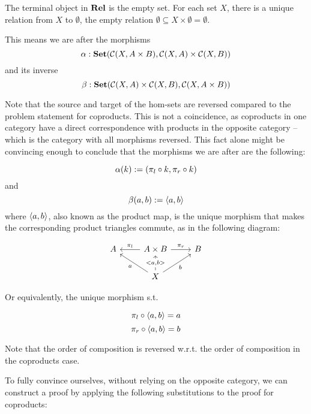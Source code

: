 \begin{solution}\label{sol:terminal_rel}
	The terminal object in $\mathbf{Rel}$ is the empty set. For each set $X$, there is a unique relation from $X$ to $\emptyset$, the empty relation $\emptyset \subseteq X \times \emptyset = \emptyset$.
\end{solution}

\begin{solution}\label{sol:product-represent}
\newcommand{\CP}{\CC(A+B,X)}
\newcommand{\CQ}{\CC(A,X)\times\CC(B,X)}
\newcommand{\PP}{\CC(X,A\times B)}
\newcommand{\PQ}{\CC(X,A)\times\CC(X,B)}
	
This means we are after the morphisms \[\alpha:\SET(\PP, \PQ)\] and its inverse \[\beta:\SET(\PQ, \PP)\]

Note that the source and target of the hom-sets are reversed compared to the problem statement for coproducts. This is not a coincidence, as coproducts in one category have a direct correspondence with products in the opposite category -- which is the category with all morphisms reversed. This fact alone might be convincing enough to conclude that the morphisms we are after are the following:

\[\alpha(k):=(\pi_l \circ k, \pi_r \circ k)\] and \[\beta(a,b) := \langle a, b \rangle\] where $\langle a, b \rangle$, also known as the product map, is the unique morphism that makes the corresponding product triangles commute, as in the following diagram:

\[
\begin{tikzcd}
A & A\times B \arrow[r, "\pi_r"] \arrow[l, "\pi_l"']                    & B \\
	& X \arrow[u, "{<a,b>}" description] \arrow[ru, "b"'] \arrow[lu, "a"] &  
\end{tikzcd}
\]

Or equivalently, the unique morphism s.t. 

\begin{equation}
\label{ga2}
	\pi_l \circ \langle a, b \rangle = a
\end{equation}
\begin{equation}
\label{gb2}
	\pi_r \circ \langle a, b \rangle = b
\end{equation}

Note that the order of composition is reversed w.r.t. the order of composition in the coproducts case.

To fully convince ourselves, without relying on the opposite category, we can construct a proof by applying the following substitutions to the proof for coproducts:


\end{solution}
